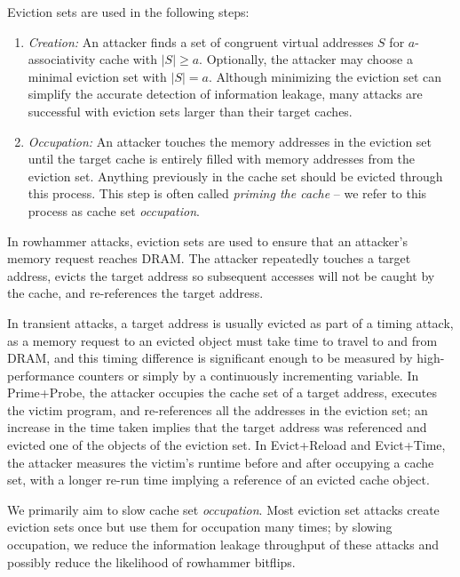 \documentclass[letterpaper, twocolumn]{article}
\begin{document}

Eviction sets are used in the following steps:

\begin{enumerate}
    \item \textit{Creation:} An attacker finds a set of congruent virtual addresses $S$ for $a$-associativity cache with $|S| \geq a$. Optionally, the attacker may choose a minimal eviction set with $|S|=a$.
    Although minimizing the eviction set can simplify the accurate detection of information leakage,
    many attacks are successful with eviction sets larger than their target caches.

    \item \textit{Occupation:} An attacker touches the memory addresses in the eviction set until the target cache is entirely filled with memory addresses from the eviction set.
    Anything previously in the cache set should be evicted through this process.
    This step is often called \textit{priming the cache} – we refer to this process as cache set \textit{occupation}.
\end{enumerate}

In rowhammer attacks, eviction sets are used to ensure that an attacker's memory request reaches DRAM.
The attacker repeatedly touches a target address, evicts the target address so subsequent accesses will not be caught by the cache,
and re-references the target address.

In transient attacks, a target address is usually evicted as part of a timing attack, as a memory request to an evicted object
must take time to travel to and from DRAM, and this timing difference is significant enough to be measured
by high-performance counters or simply by a continuously incrementing variable.
In Prime+Probe, the attacker occupies the cache set of a target address, executes the victim program, and re-references
all the addresses in the eviction set; an increase in the time taken implies that the target address was referenced and evicted
one of the objects of the eviction set.
In Evict+Reload and Evict+Time, the attacker measures the victim's runtime before and after occupying a cache set,
with a longer re-run time implying a reference of an evicted cache object.

We primarily aim to slow cache set \textit{occupation}.
Most eviction set attacks create eviction sets once but use them for occupation many times;
by slowing occupation, we reduce the information leakage throughput of these attacks
and possibly reduce the likelihood of rowhammer bitflips.
\end{document}
